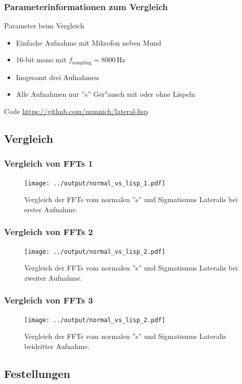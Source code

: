 \documentclass[11pt]{beamer}
\begin{document}
\begin{frame}
\frametitle{Parameterinformationen zum Vergleich}
\begin{exampleblock}{Parameter beim Vergleich}
\begin{itemize}
\item Einfache Aufnahme mit Mikrofon neben Mund
\item 16-bit mono mit $f_\mathrm{sampling}=8000$\,Hz
\item Insgesamt drei Aufnahmen
\item Alle Aufnahmen nur ''s'' Ger"ausch mit oder ohne Lispeln
\end{itemize}
\end{exampleblock}
\begin{block}{Code}
\url{https://github.com/munnich/lateral-lisp}
\end{block}
\end{frame}

\subsection{Vergleich}

\begin{frame}
\frametitle{Vergleich von FFTs 1}
\begin{figure}
\texttt{[image: ../output/normal\_vs\_lisp\_1.pdf]}
\caption{Vergleich der FFTs vom normalen ''s'' und Sigmatismus Lateralis bei erster Aufnahme.}
\end{figure}
\end{frame}

\begin{frame}
\frametitle{Vergleich von FFTs 2}
\begin{figure}
\texttt{[image: ../output/normal\_vs\_lisp\_2.pdf]}
\caption{Vergleich der FFTs vom normalen ''s'' und Sigmatismus Lateralis bei zweiter Aufnahme.}
\end{figure}
\end{frame}

\begin{frame}
\frametitle{Vergleich von FFTs 3}
\begin{figure}
\texttt{[image: ../output/normal\_vs\_lisp\_2.pdf]}
\caption{Vergleich der FFTs vom normalen ''s'' und Sigmatismus Lateralis beidritter Aufnahme.}
\end{figure}
\end{frame}

\subsection{Festellungen}
\end{document}
